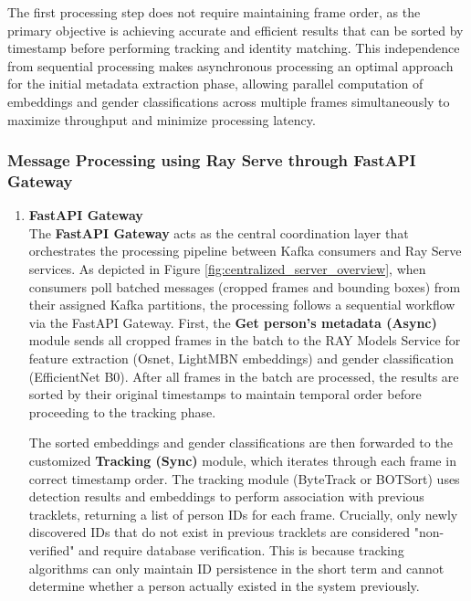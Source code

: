 The first processing step does not require maintaining frame order, as the primary objective is achieving accurate and efficient results that can be sorted by timestamp before performing tracking and identity matching. This independence from sequential processing makes asynchronous processing an optimal approach for the initial metadata extraction phase, allowing parallel computation of embeddings and gender classifications across multiple frames simultaneously to maximize throughput and minimize processing latency.


\subsubsection{Message Processing using Ray Serve through FastAPI Gateway}

\begin{enumerate}
    \item \textbf{FastAPI Gateway}\\
    
    The \textbf{FastAPI Gateway} acts as the central coordination layer that orchestrates the processing pipeline between Kafka consumers and Ray Serve services. As depicted in Figure \ref{fig:centralized_server_overview}, when consumers poll batched messages (cropped frames and bounding boxes) from their assigned Kafka partitions, the processing follows a sequential workflow via the FastAPI Gateway. First, the \textbf{Get person's metadata (Async)} module sends all cropped frames in the batch to the RAY Models Service for feature extraction (Osnet, LightMBN embeddings) and gender classification (EfficientNet B0). After all frames in the batch are processed, the results are sorted by their original timestamps to maintain temporal order before proceeding to the tracking phase.

    The sorted embeddings and gender classifications are then forwarded to the customized \textbf{Tracking (Sync)} module, which iterates through each frame in correct timestamp order. The tracking module (ByteTrack or BOTSort) uses detection results and embeddings to perform association with previous tracklets, returning a list of person IDs for each frame. Crucially, only newly discovered IDs that do not exist in previous tracklets are considered "non-verified" and require database verification. This is because tracking algorithms can only maintain ID persistence in the short term and cannot determine whether a person actually existed in the system previously.


\end{enumerate}
